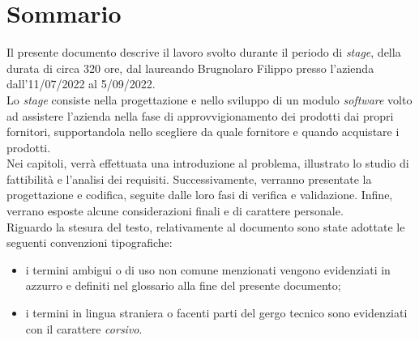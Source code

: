 
\cleardoublepage
{}
{}
\begingroup
\let\clearpage\relax
\let\cleardoublepage\relax
\let\cleardoublepage\relax

\chapter*{Sommario}

\noindent Il presente documento descrive il
lavoro svolto durante il periodo di \textit{stage},
della durata di circa 320 ore, dal laureando
Brugnolaro Filippo presso l'azienda
\textit{\myCompany} dall'11/07/2022 al
5/09/2022.\\
\noindent Lo \textit{stage} consiste nella progettazione e nello sviluppo di un modulo \textit{software} volto
ad assistere l'azienda nella fase di approvvigionamento dei prodotti dai propri fornitori, supportandola nello scegliere
da quale fornitore e quando acquistare i prodotti.\\
Nei capitoli, verrà effettuata una introduzione al problema, illustrato lo studio di fattibilità e l'analisi dei requisiti.
Successivamente, verranno presentate la progettazione e codifica, seguite dalle loro fasi di verifica e validazione.
Infine, verrano esposte alcune considerazioni finali e di carattere personale.\\
\noindent Riguardo la stesura del testo, relativamente al documento sono state adottate le seguenti convenzioni tipografiche:
\begin{itemize}
	\item i termini ambigui o di uso non comune menzionati vengono evidenziati in azzurro e definiti nel glossario alla fine del presente documento;
	\item i termini in lingua straniera o facenti parti del gergo tecnico sono evidenziati con il carattere \emph{corsivo}.
\end{itemize}

%
%

\endgroup			

\vfill

